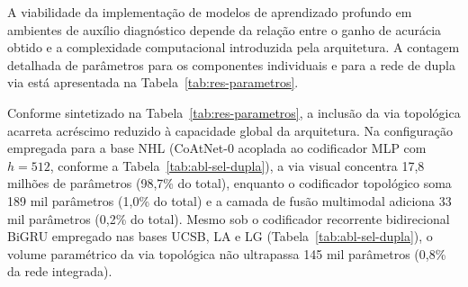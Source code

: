 A viabilidade da implementação de modelos de aprendizado profundo em ambientes de auxílio diagnóstico depende da relação entre o ganho de acurácia obtido e a complexidade computacional introduzida pela arquitetura. A contagem detalhada de parâmetros para os componentes individuais e para a rede de dupla via está apresentada na Tabela~\ref{tab:res-parametros}.

\begin{table}[htb]
\centering
\caption{Contagem de parâmetros treináveis por componente da arquitetura de dupla via.}
\label{tab:res-parametros}
\small
{}
\end{table}

Conforme sintetizado na Tabela~\ref{tab:res-parametros}, a inclusão da via topológica acarreta acréscimo reduzido à capacidade global da arquitetura. Na configuração empregada para a base NHL (CoAtNet-0 acoplada ao codificador MLP com $h=512$, conforme a Tabela~\ref{tab:abl-sel-dupla}), a via visual concentra 17{,}8 milhões de parâmetros (98{,}7\% do total), enquanto o codificador topológico soma 189 mil parâmetros (1{,}0\% do total) e a camada de fusão multimodal adiciona 33 mil parâmetros (0{,}2\% do total). Mesmo sob o codificador recorrente bidirecional BiGRU empregado nas bases UCSB, LA e LG (Tabela~\ref{tab:abl-sel-dupla}), o volume paramétrico da via topológica não ultrapassa 145 mil parâmetros (0{,}8\% da rede integrada).


